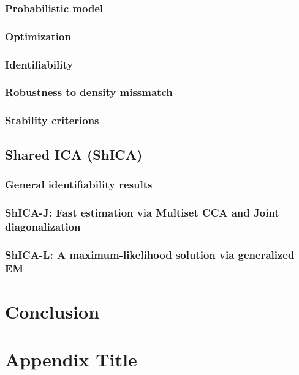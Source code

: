 \documentclass[12pt]{report}
\begin{document}
\subsection{Probabilistic model}
\subsection{Optimization}
\subsection{Identifiability}
\subsection{Robustness to density missmatch}
\subsection{Stability criterions}
\section{Shared ICA (ShICA)}
\subsection{General identifiability results}
\subsection{ShICA-J: Fast estimation via Multiset CCA and Joint diagonalization}
\subsection{ShICA-L: A maximum-likelihood solution via generalized EM}

\chapter{Conclusion}

\appendix
\chapter{Appendix Title}
\end{document}
